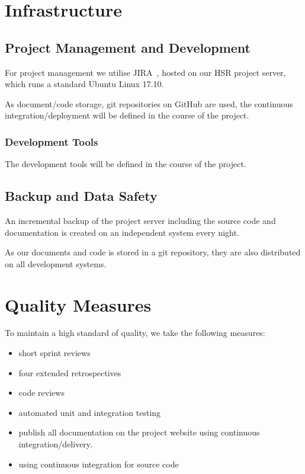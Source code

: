 \chapter{Infrastructure}
\section{Project Management and Development}
For project management we utilise JIRA~\cite{atlassian-opensource}, hosted on our HSR project server, which runs a standard Ubuntu Linux 17.10.

As document/code storage, git repositories on GitHub are used, the continuous integration/deployment will be defined in the course of the project.

\subsection{Development Tools}
The development tools will be defined in the course of the project.

\section{Backup and Data Safety}
An incremental backup of the project server including the source code and documentation is created on an independent system every night.

As our documents and code is stored in a git repository, they are also distributed on all development systems.


\chapter{Quality Measures}
To maintain a high standard of quality, we take the following measures:

\begin{multicols}{2}
    \begin{itemize}
        \item short sprint reviews
        \item four extended retrospectives
        \item code reviews
        \item automated unit and integration testing
        \item publish all documentation on the project website using continuous integration/delivery.
        \item using continuous integration for source code
    \end{itemize}
\end{multicols}

